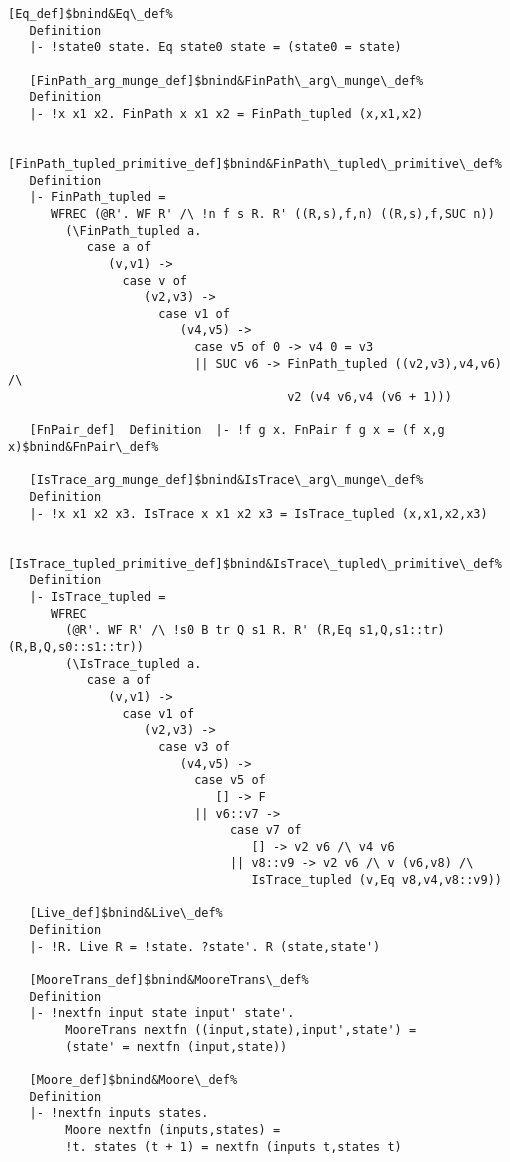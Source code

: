 \documentclass[12pt]{article}
\begin{document}
\begin{footnotesize}
\begin{Verbatim}[commandchars=\$\&\%]
   [Eq_def]$bnind&Eq\_def%
   Definition
   |- !state0 state. Eq state0 state = (state0 = state)
   
   [FinPath_arg_munge_def]$bnind&FinPath\_arg\_munge\_def%
   Definition
   |- !x x1 x2. FinPath x x1 x2 = FinPath_tupled (x,x1,x2)
   
   [FinPath_tupled_primitive_def]$bnind&FinPath\_tupled\_primitive\_def%
   Definition
   |- FinPath_tupled =
      WFREC (@R'. WF R' /\ !n f s R. R' ((R,s),f,n) ((R,s),f,SUC n))
        (\FinPath_tupled a.
           case a of
              (v,v1) ->
                case v of
                   (v2,v3) ->
                     case v1 of
                        (v4,v5) ->
                          case v5 of 0 -> v4 0 = v3
                          || SUC v6 -> FinPath_tupled ((v2,v3),v4,v6) /\
                                       v2 (v4 v6,v4 (v6 + 1)))
   
   [FnPair_def]  Definition  |- !f g x. FnPair f g x = (f x,g x)$bnind&FnPair\_def%
   
   [IsTrace_arg_munge_def]$bnind&IsTrace\_arg\_munge\_def%
   Definition
   |- !x x1 x2 x3. IsTrace x x1 x2 x3 = IsTrace_tupled (x,x1,x2,x3)
   
   [IsTrace_tupled_primitive_def]$bnind&IsTrace\_tupled\_primitive\_def%
   Definition
   |- IsTrace_tupled =
      WFREC
        (@R'. WF R' /\ !s0 B tr Q s1 R. R' (R,Eq s1,Q,s1::tr) (R,B,Q,s0::s1::tr))
        (\IsTrace_tupled a.
           case a of
              (v,v1) ->
                case v1 of
                   (v2,v3) ->
                     case v3 of
                        (v4,v5) ->
                          case v5 of
                             [] -> F
                          || v6::v7 ->
                               case v7 of
                                  [] -> v2 v6 /\ v4 v6
                               || v8::v9 -> v2 v6 /\ v (v6,v8) /\
                                  IsTrace_tupled (v,Eq v8,v4,v8::v9))
   
   [Live_def]$bnind&Live\_def%
   Definition
   |- !R. Live R = !state. ?state'. R (state,state')
   
   [MooreTrans_def]$bnind&MooreTrans\_def%
   Definition
   |- !nextfn input state input' state'.
        MooreTrans nextfn ((input,state),input',state') =
        (state' = nextfn (input,state))
   
   [Moore_def]$bnind&Moore\_def%
   Definition
   |- !nextfn inputs states.
        Moore nextfn (inputs,states) =
        !t. states (t + 1) = nextfn (inputs t,states t)
   

\end{Verbatim}
\end{footnotesize}
\end{document}
